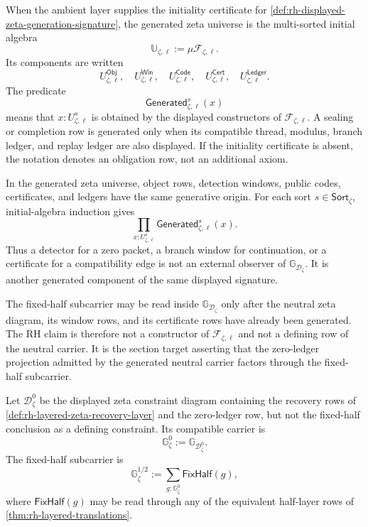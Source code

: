 \begin{definition}
\label{def:rh-generated-zeta-universe}
When the ambient layer supplies the initiality certificate for
\autoref{def:rh-displayed-zeta-generation-signature}, the generated zeta
universe is the multi-sorted initial algebra
$$
\mathbb U_{\zeta,\ell}:=\mu\mathcal F_{\zeta,\ell}.
$$
Its components are written
$$
U_{\zeta,\ell}^{\mathsf{Obj}},
\quad
U_{\zeta,\ell}^{\mathsf{Win}},
\quad
U_{\zeta,\ell}^{\mathsf{Code}},
\quad
U_{\zeta,\ell}^{\mathsf{Cert}},
\quad
U_{\zeta,\ell}^{\mathsf{Ledger}}.
$$
The predicate
$$
\mathsf{Generated}_{\zeta,\ell}^{s}(x)
$$
means that $x:U_{\zeta,\ell}^{s}$ is obtained by the displayed
constructors of $\mathcal F_{\zeta,\ell}$. A sealing or completion row is
generated only when its compatible thread, modulus, branch ledger, and
replay ledger are also displayed. If the initiality certificate is absent,
the notation denotes an obligation row, not an additional axiom.
\end{definition}

\begin{principle}
\label{prin:rh-zeta-internal-origin-windows-certificates}
In the generated zeta universe, object rows, detection windows, public
codes, certificates, and ledgers have the same generative origin. For each
sort $s\in\mathsf{Sort}_{\zeta}$, initial-algebra induction gives
$$
\prod_{x:U_{\zeta,\ell}^{s}}
\mathsf{Generated}_{\zeta,\ell}^{s}(x).
$$
Thus a detector for a zero packet, a branch window for continuation, or a
certificate for a compatibility edge is not an external observer of
$\mathbb G_{\mathcal D_{\zeta}}$. It is another generated component of the
same displayed signature.
\end{principle}

\begin{principle}
\label{prin:rh-fixed-half-closure-not-generator}
The fixed-half subcarrier may be read inside
$\mathbb G_{\mathcal D_{\zeta}}$ only after the neutral zeta diagram, its
window rows, and its certificate rows have already been generated. The RH
claim is therefore not a constructor of
$\mathcal F_{\zeta,\ell}$ and not a defining row of the neutral carrier. It
is the section target asserting that the zero-ledger projection admitted by
the generated neutral carrier factors through the fixed-half subcarrier.
\end{principle}

\begin{definition}
\label{def:rh-neutral-fixed-half-zeta-carriers}
Let $\mathcal D_{\zeta}^{0}$ be the displayed zeta constraint diagram
containing the recovery rows of \autoref{def:rh-layered-zeta-recovery-layer}
and the zero-ledger row, but not the fixed-half conclusion as a defining
constraint. Its compatible carrier is
$$
\mathbb G_{\zeta}^{0}:=\mathbb G_{\mathcal D_{\zeta}^{0}}.
$$
The fixed-half subcarrier is
$$
\mathbb G_{\zeta}^{1/2}
:=
\sum_{g:\mathbb G_{\zeta}^{0}}\mathsf{FixHalf}(g),
$$
where $\mathsf{FixHalf}(g)$ may be read through any of the equivalent
half-layer rows of \autoref{thm:rh-layered-translations}.
\end{definition}

